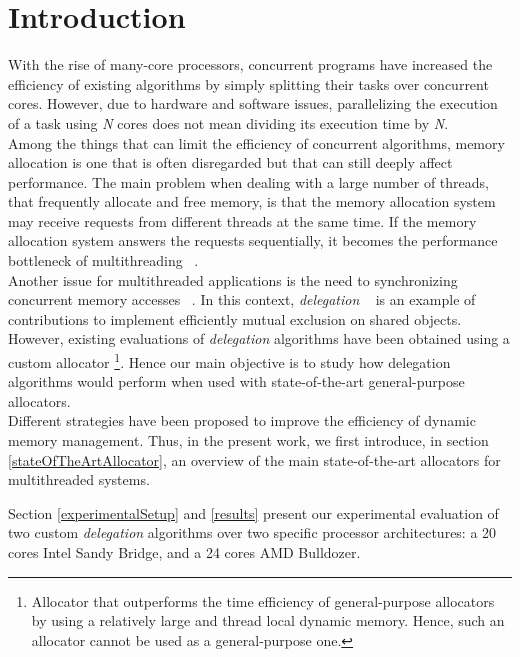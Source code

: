 \documentclass[10pt]{article}											%
\begin{document}
\section{Introduction}
With the rise of many-core processors, concurrent programs have increased the efficiency of existing algorithms by simply splitting their tasks over concurrent cores.   However, due to hardware and software issues, parallelizing the execution of a task using \textit{N} cores does not mean dividing its execution time by \textit{N}.\\

Among the things that can limit the efficiency of concurrent algorithms, memory allocation is one that is often disregarded but that can still deeply affect performance. The main problem when dealing with a large number of threads,  that frequently allocate and free memory, is that the memory allocation system may receive requests from different threads at the same time.   If the memory allocation system answers the requests sequentially, it becomes the performance bottleneck of multithreading ~\cite{cacheCoherence_sorin}.\\

Another issue for multithreaded applications is the need to synchronizing concurrent memory accesses ~\cite{cacheCoherence_sorin}.   In this context, \textit{delegation} ~\cite{delegationCS_roparsPetrovic} is an example of contributions to implement efficiently mutual exclusion on shared objects.   However, existing evaluations of \textit{delegation} algorithms have been obtained using a custom allocator \footnote{Allocator that outperforms the time efficiency of general-purpose allocators by using a relatively large and thread local dynamic memory.   Hence, such an allocator cannot be used as a general-purpose one.}.   Hence our main objective is to study how delegation algorithms would perform when used with state-of-the-art general-purpose allocators.\\

Different strategies have been proposed to improve the efficiency of dynamic memory management.   Thus, in the present work, we first introduce, in section \ref{stateOfTheArtAllocator}, an overview of the main state-of-the-art allocators for multithreaded systems.

Section \ref{experimentalSetup} and \ref{results} present our experimental evaluation of two custom \textit{delegation} algorithms over two specific processor architectures:  a 20 cores Intel Sandy Bridge, and a 24 cores AMD Bulldozer.\\
\end{document}
